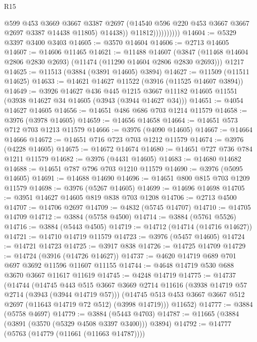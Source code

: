 \begin{lexlean}{R15}
\begin{coremodule}
                            @599
                            @453
                            @3669
                            @3667
                            @3387
                            @2697
                            (@14540 @596 @220 @453 @3667 @3667 @2697 @3387 @14438 @11805)
                            @14438))
                        @11812))))))))))
@14604 := @5329 @3397 @3400 @3403
@14605 := @3570 @14604
@14606 := @2713 @14605
@14607 := @14606 @11465
@14621 := @11488
    @14607
    (@3847 (@11468 @14604 @2806 @2830 @2693) (@11474 (@11290 @14604 @2806 @2830 @2693)))
    @1217
@14625 := @11513 (@3884 (@3891 @14605) @3894)
@14627 := @11509 (@11511 @14625)
@14633 := @14621 @14627 @11522 (@3916 (@11525 @14607 @3894))
@14649 := @3926
    @14627
    @436
    @445
    @1215
    @3667
    @11182
    @14605
    @11551
    (@3938 @14627 @34 @14605 (@3943 (@3944 @14627 @34)))
@14651 := @4054 @14627 @14605
@14656 := @14651 @486 @686 @703 @1214 @11579
@14658 := @3976 (@3978 @14605)
@14659 := @14656 @14658
@14664 := @14651 @573 @712 @703 @1213 @11579
@14666 := @3976 (@4090 @14605)
@14667 := @14664 @14666
@14672 := @14651 @716 @723 @703 @1212 @11579
@14674 := @3976 (@4228 @14605)
@14675 := @14672 @14674
@14680 := @14651 @727 @736 @784 @1211 @11579
@14682 := @3976 (@4431 @14605)
@14683 := @14680 @14682
@14688 := @14651 @787 @796 @703 @1210 @11579
@14690 := @3976 (@5095 @14605)
@14691 := @14688 @14690
@14696 := @14651 @800 @815 @703 @1209 @11579
@14698 := @3976 (@5267 @14605)
@14699 := @14696 @14698
@14705 := @3951 @14627 @14605 @819 @838 @703 @1208
@14706 := @2713 @4500
@14707 := @14706 @2697
@14709 := @4832 (@5745 @14707)
@14710 := @14705 @14709
@14712 := @3884 (@5758 @4500)
@14714 := @3884 (@5761 @5526)
@14716 := @3884 (@5443 @4505)
@14719 := @14712 (@14714 (@14716 @14627))
@14721 := @14710 @14719 @11579
@14723 := @3976 (@5457 @14605)
@14724 := @14721 @14723
@14725 := @3917 @838
@14726 := @14725 @14709
@14729 := @14724 (@3916 (@14726 @14627))
@14737 := @4620 @14719 @689 @701 @697 @3692 @11596 @11607 @11155
@14744 := @4648 @14719 @530 @688 @3670 @3667 @11617 @11619
@14745 := @4248 @14719
@14775 := @14737
    (@14744
      (@14745
        @443
        @515
        @3667
        @3669
        @2714
        @11616
        (@3938 @14719 @57 @2714 (@3943 (@3944 @14719 @57)))
        (@14745 @513 @453 @3667 @3667 @512 @2697 (@11643 @14719 @72 @512) (@3998 @14719)))
      @11652)
@14777 := @3884 (@5758 @4697)
@14779 := @3884 (@5443 @4703)
@14787 := @11665 (@3884 (@3891 (@3570 (@5329 @4508 @3397 @3400))) @3894)
@14792 := @14777 (@5763 (@14779 (@11661 (@11663 @14787))))

\end{coremodule}
\end{lexlean}
